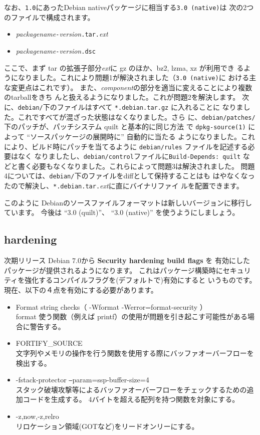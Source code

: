 \documentclass[mingoth,a4paper]{jsarticle}
\begin{document}
なお、\verb|1.0|にあったDebian nativeパッケージに相当する\verb|3.0 (native)|は
次の2つのファイルで構成されます。
\begin{itemize}
 \item \textit{packagename}\verb|-|\textit{version}\verb|.tar.|\textit{ext}
 \item \textit{packagename}\verb|-|\textit{version}\verb|.dsc|
\end{itemize}

ここで、まず tar の拡張子部分\textit{ext}に gz のほか、bz2, lzma, xz が利用でき
るようになりました。これにより問題1が解決されました（\verb|3.0 (native)|に
おける主な変更点はこれです）。
また、\textit{component}の部分を適当に変えることにより複数のtarballをきち
んと扱えるようになりました。これが問題2を解決します。
次に、\verb|debian/|下のファイルはすべて \verb|*.debian.tar.gz| に入れることに
なりました。これですべてが混ざった状態はなくなりました。さら
に、\verb|debian/patches/| 下のパッチが、パッチシステム quilt と基本的に同じ方法
で \verb|dpkg-source(1)| によって ``ソースパッケージの展開時に'' 自動的に当たる
ようになりました。これにより、ビルド時にパッチを当てるように \verb|debian/rules| ファイルを記述する必要はなく
なりましたし、\verb|debian/control|ファイルに\verb|Build-Depends: quilt|
などと書く必要もなくなりました。これらによって問題3は解決されました。
問題4については、\verb|debian/|下のファイルをdiffとして保持することはも
はやなくなったので解決し、\verb|*.debian.tar.|\textit{ext}に直にバイナリファイ
ルを配置できます。

このように Debianのソースファイルフォーマットは新しいバージョンに移行しています。
今後は ``3.0 (quilt)''、 ``3.0 (native)'' を使うようにしましょう。

\subsection{hardening}
次期リリース Debian 7.0から {\bf Security hardening build flags} を
有効にしたパッケージが提供されるようになります。
これはパッケージ構築時にセキュリティを強化するコンパイルフラグを(デフォルトで)有効にすると
いうものです。現在、以下の４点を有効にする必要があります。

\begin{itemize}
  \item Format string checks（ -Wformat -Werror=format-security ）\\
  format 使う関数（例えば printf）の使用が問題を引き起こす可能性がある場合に警告する。
  \item FORTIFY\_SOURCE \\
  文字列やメモリの操作を行う関数を使用する際にバッファオーバーフローを検出する。
  \item -fstack-protector \texttt{--}param=ssp-buffer-size=4 \\
  スタック破壊攻撃等によるバッファオーバーフローをチェックするための追加コードを生成する。
  4バイトを超える配列を持つ関数を対象にする。
  \item -z,now,-z,relro \\
  リロケーション領域(GOTなど)をリードオンリーにする。
\end{itemize}
\end{document}
